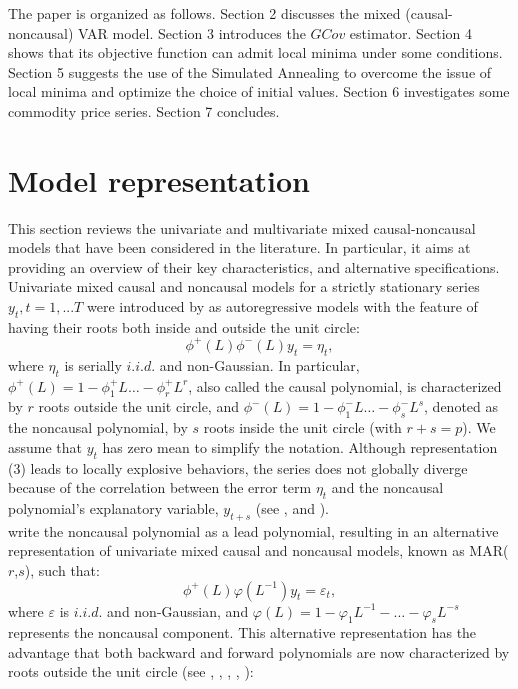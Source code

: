 \documentclass[<1p>]{elsarticle} %
\begin{document}
The paper is organized as follows. Section 2 discusses the mixed (causal-noncausal) VAR model.
Section 3 introduces the $GCov$ estimator. Section 4 shows that its objective function can admit local minima under some conditions. Section 5 suggests the use of the Simulated Annealing to overcome the issue of local minima and optimize the choice of initial values. Section 6 investigates some commodity price series. Section 7 concludes.

\section{Model representation}
This section reviews the univariate and multivariate mixed causal-noncausal models that have been considered in the literature. In particular, it aims at providing an overview of their key characteristics, and alternative specifications.\\
\indent Univariate mixed causal and noncausal models for a strictly stationary series $y_t, t=1,...T$ were introduced by \cite{breidt1991maximum} as autoregressive models with the feature of having their roots both inside and outside the unit circle:
\begin{equation}
	\phi^{+} (L) \phi^{-}(L) y_{t}=\eta_{t},
\end{equation}
where $\eta_t$ is serially $i.i.d.$ and non-Gaussian. In particular, $\phi^{+}(L)= 1 - \phi_{1}^{+} L \dots - \phi_{r}^{+}L^{r}$, also called the causal polynomial, is characterized by $r$ roots outside the unit circle, and $\phi^{-}(L)= 1 - \phi_{1}^{-} L \dots - \phi_{s}^{-}L^{s}$, denoted as the noncausal polynomial, by $s$ roots inside the unit circle (with $r+s=p$). We assume that $y_{t}$ has zero mean to simplify the notation. Although representation (3) leads to locally explosive behaviors, the series does not globally diverge because of the correlation between the error term $\eta_t$ and the noncausal polynomial's explanatory variable, $y_{t+s}$ (see \cite{breid1991maximum}, and \cite{lanne2011noncausal}).\\
\indent \cite{lanne2011noncausal} write  the noncausal polynomial as a lead polynomial, resulting in an alternative representation of univariate mixed causal and noncausal models, known as MAR($r$,$s$), such that:
\begin{equation}
	\phi^{+} (L) \varphi (L^{-1}) y_{t} = \varepsilon_{t},
\end{equation}
where $\varepsilon$ is $i.i.d.$ and non-Gaussian, and $\varphi (L)=1 - \varphi_{1} L^{-1} - \dots - \varphi_{s} L^{-s}$  represents the noncausal component. This alternative representation has the advantage that both backward and forward polynomials are now characterized by roots outside the unit circle (see \cite{hecq2016identification}, \cite{gourieroux2016filtering}, \cite{gourieroux2018misspecification}, \cite{hecq2021forecasting}, \cite{giancaterini2022inference}):
\end{document}

